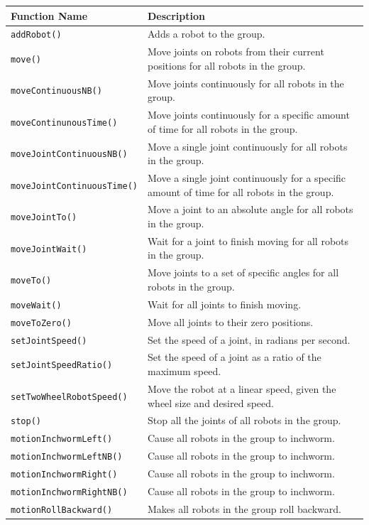\documentclass{article}
\begin{document}
\begin{tabular}{p{4.5cm}p{8cm}} \hline 
Function Name & Description \\
\hline
\texttt{addRobot()} & Adds a robot to the group. \\
\texttt{move()} & Move joints on robots from their current positions for all robots in the group. \\
\texttt{moveContinuousNB()} & Move joints continuously for all robots in the group. \\
\texttt{moveContinunousTime()} & Move joints continuously for a specific amount of time for all robots in the group.\\
\texttt{moveJointContinuousNB()} & Move a single joint continuously for all robots in the group. \\
\texttt{moveJointContinuousTime()} & Move a single joint continuously for a specific amount of time for all robots in the group.\\
\texttt{moveJointTo()} & Move a joint to an absolute angle for all robots in the group.\\
\texttt{moveJointWait()} & Wait for a joint to finish moving for all robots in the group. \\
\texttt{moveTo()} & Move joints to a set of specific angles for all robots in the group. \\
\texttt{moveWait()} & Wait for all joints to finish moving. \\
\texttt{moveToZero()} & Move all joints to their zero positions. \\
\texttt{setJointSpeed()} & Set the speed of a joint, in radians per second. \\
\texttt{setJointSpeedRatio()} & Set the speed of a joint as a ratio of the maximum speed. \\
\texttt{setTwoWheelRobotSpeed()} & Move the robot at a linear speed, given the wheel size and desired speed.\\
\texttt{stop()} & Stop all the joints of all robots in the group. \\
\texttt{motionInchwormLeft()} & Cause all robots in the group to inchworm. \\
\texttt{motionInchwormLeftNB()} & Cause all robots in the group to inchworm. \\
\texttt{motionInchwormRight()} & Cause all robots in the group to inchworm. \\
\texttt{motionInchwormRightNB()} & Cause all robots in the group to inchworm. \\
\texttt{motionRollBackward()} & Makes all robots in the group roll backward. \\

\end{tabular}
\end{document}
